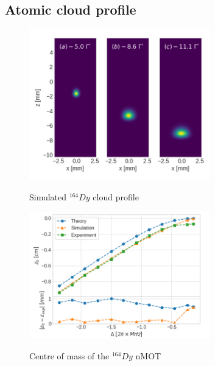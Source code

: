 \subsection{Atomic cloud profile}
\label{sec:cloud-profile-dysprosium}

\begin{figure}[!ht]
    \centering
    \caption{Simulated ${}^{164}Dy$ cloud profile}
    \includegraphics[width=0.7\textwidth]{USPSC-img/dy_dreon_cloud_profile.png}
    \vspace{5px}
    \label{fig:dy-atomic-cloud-profile}
\end{figure}

\begin{figure}[!ht]
    \centering
    \caption{Centre of mass of the ${}^{164}Dy$ nMOT}
    \includegraphics[width=0.7\textwidth]{USPSC-img/dy_centre_of_mass.png}
    \vspace{5px}
    \label{fig:dy-centre-of-mass}
\end{figure}

